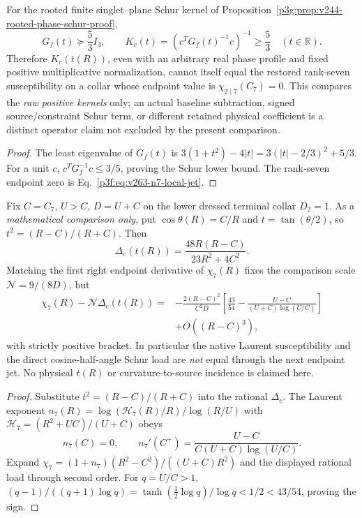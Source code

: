 \documentclass[11pt,a4paper]{article}
\begin{document}
\begin{corollary}
\label{p3g:cor:v245-rooted-schur-terminal-positivity}
For the rooted finite singlet--plane Schur kernel of
Proposition~\ref{p3g:prop:v244-rooted-phase-schur-proof},
\[
 \boxed{G_f(t)\succeq\frac53I_3,\qquad
 K_c(t)=(c^TG_f(t)^{-1}c)^{-1}\ge\frac53
 \quad(t\in\mathbb R).}
\]
Therefore $K_c(t(R))$, even with an arbitrary real phase profile and
fixed positive multiplicative normalization, cannot itself equal the
restored rank-seven susceptibility on a collar whose endpoint value
is $\chi_{2\mid7}(C_7)=0$. This compares the \emph{raw positive
kernels} only; an actual baseline subtraction, signed source/constraint
Schur term, or different retained physical coefficient is a distinct
operator claim not excluded by the present comparison.
\end{corollary}
\begin{proof}
The least eigenvalue of $G_f(t)$ is
$3(1+t^2)-4|t|=3(|t|-2/3)^2+5/3$.
For a unit $c$, $c^TG_f^{-1}c\le3/5$, proving the Schur lower bound.
The rank-seven endpoint zero is
Eq.~\eqref{p3f:eq:v263-n7-local-jet}.
\end{proof}

\begin{proposition}
\label{p3g:prop:v245-cosine-half-angle-mismatch}
Fix $C=C_7$, $U>C$, $D=U+C$ on the lower dressed
terminal collar $D_2=1$. As a \emph{mathematical comparison only}, put
$\cos\theta(R)=C/R$ and $t=\tan(\theta/2)$, so
$t^2=(R-C)/(R+C)$. Then
\[
 \boxed{\Delta_c(t(R))=\frac{48R(R-C)}{23R^2+4C^2}.}
\]
Matching the first right endpoint derivative of $\chi_7(R)$
fixes the comparison scale $\mathcal N=9/(8D)$, but
\begin{align*}
 \chi_7(R)-\mathcal N\Delta_c(t(R))
 ={}&-\frac{2(R-C)^2}{C^2D}
 \left[\frac{43}{54}-\frac{U-C}{(U+C)\log(U/C)}\right]\\
 &+O((R-C)^3),
\end{align*}
with strictly positive bracket. In particular the native Laurent
susceptibility and the direct cosine-half-angle Schur load are \emph{not}
equal through the next endpoint jet. No physical $t(R)$ or
curvature-to-source incidence is claimed here.
\end{proposition}
\begin{proof}
Substitute $t^2=(R-C)/(R+C)$ into the rational $\Delta_c$.
The Laurent exponent
$n_7(R)=\log(\mathscr H_7(R)/R)/\log(R/U)$ with
$\mathscr H_7=(R^2+UC)/(U+C)$ obeys
\[
 n_7(C)=0,\qquad
 n_7'(C^+)=\frac{U-C}{C(U+C)\log(U/C)}.
\]
Expand
$\chi_7=(1+n_7)(R^2-C^2)/((U+C)R^2)$
and the displayed rational load through second order.
For $q=U/C>1$,
$(q-1)/((q+1)\log q)
=\tanh(\tfrac12\log q)/\log q<1/2<43/54$, proving the sign.
\end{proof}
\end{document}
